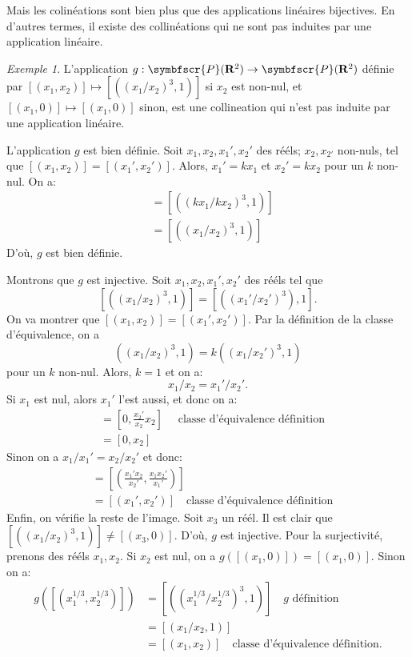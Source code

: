 \documentclass[12pt, oneside]{memoir}
\theoremstyle{definition}
\theoremstyle{remark}
\newtheorem{exm}{Exemple}
\newcommand{\proj}{\symbfscr{P}}
\newcommand{\R}{\mathbf{R}}
\begin{document}
Mais les colinéations sont bien plus que des applications linéaires bijectives.
En d'autres termes, il existe des collinéations qui ne sont pas induites par une
application linéaire.
\begin{exm}
  L'application $g: \proj(\R^2) \to \proj(\R^2)$ définie par
  $[(x_1, x_2)] \mapsto [((x_{1} / x_{2})^3, 1)]$ si $x_{2}$ est non-nul, et
  $[(x_{1}, 0)] \mapsto [(x_{1}, 0)]$ sinon, est une collineation qui n'est pas
  induite par une application linéaire.

  L'application $g$ est bien définie. Soit $x_{1}, x_{2}, x_{1}', x_{2}'$ des
  rééls; $x_{2}, x_{2'}$ non-nuls, tel que
  $[(x_{1}, x_{2})] = [(x_{1}', x_{2}')]$. Alors, $x_{1}' = kx_{1}$ et
  $x_{2}' = kx_{2}$ pour un $k$ non-nul. On a:
  \begin{align*}
    [((x_{1}' / x_{2}')^{3}, 1)] &= [((kx_{1} / kx_{2})^{3}, 1)] \\
                                 &= [((x_{1} / x_{2})^{3}, 1)]
  \end{align*}
  D'où, $g$ est bien définie.

  Montrons que $g$ est injective. Soit $x_{1}, x_{2}, x_{1}', x_{2}'$ des rééls
  tel que
  $$
  [((x_{1} / x_{2})^{3}, 1)] = [((x_{1}' / x_{2}')^{3}), 1].
  $$
  On va montrer que $[(x_{1}, x_{2})] = [(x_{1}', x_{2}')]$. Par la définition
  de la classe d'équivalence, on a
  $$
  ((x_{1} / x_{2})^{3}, 1) = k ((x_{1} / x_{2}')^{3}, 1)
  $$
  pour un $k$ non-nul. Alors, $k = 1$ et on a:
  $$
  x_{1} / x_{2} = x_{1}' / x_{2}'.
  $$
  Si $x_{1}$ est nul, alors $x_{1}'$ l'est aussi, et donc on a:
  \begin{align*}
    [(0, x_{2})] &= [0, \frac{x_{2}'}{x_{2}} x_{2}] \quad \text{ classe
                   d'équivalence définition} \\
                 &= [0, x_{2}]
  \end{align*}
  Sinon on a $x_{1} / x_{1}' = x_{2} / x_{2}'$ et donc:
  \begin{align*}
    [(x_{1}, x_{2})] &= [(\frac{x_{1}' x_{2}}{x_{2}'}, \frac{x_{1} x_{2}'}{x_{1}'})] \\
                     &= [(x_{1}', x_{2}')] \quad \text{classe d'équivalence définition}
  \end{align*}
  Enfin, on vérifie la reste de l'image. Soit $x_{3}$ un réél. Il est clair que
  $[((x_{1} / x_{2})^{3}, 1)] \neq [(x_{3}, 0)]$. D'où, $g$ est injective. Pour
  la surjectivité, prenons des rééls $x_{1}, x_{2}$. Si $x_{2}$ est nul, on a
  $g([(x_{1}, 0)]) = [(x_{1}, 0)]$. Sinon on a:
  \begin{align*}
    g([(x_{1}^{1/3}, x_{2}^{1/3})]) &= [((x_{1}^{1/3} / x_{2}^{1/3})^{3}, 1)]
                                      \quad \text{$g$ définition} \\
                                    &= [(x_{1} / x_{2}, 1)] \\
                                    &= [(x_{1}, x_{2})]
                                     \quad \text{classe d'équivalence définition}.
  \end{align*}


\end{exm}
\end{document}

